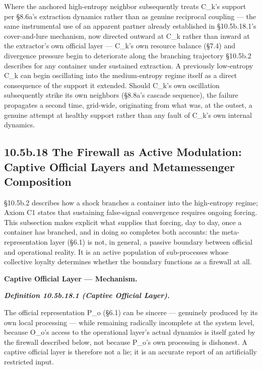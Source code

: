 \documentclass[
]{article}
\begin{document}
Where the anchored high-entropy neighbor subsequently treats C\_k's
support per §8.6a's extraction dynamics rather than as genuine
reciprocal coupling --- the same instrumental use of an apparent partner
already established in §10.5b.18.1's cover-and-lure mechanism, now
directed outward at C\_k rather than inward at the extractor's own
official layer --- C\_k's own resource balance (§7.4) and divergence
pressure begin to deteriorate along the branching trajectory §10.5b.2
describes for any container under sustained extraction. A previously
low-entropy C\_k can begin oscillating into the medium-entropy regime
itself as a direct consequence of the support it extended. Should C\_k's
own oscillation subsequently strike its own neighbors (§8.8a's cascade
sequence), the failure propagates a second time, grid-wide, originating
from what was, at the outset, a genuine attempt at healthy support
rather than any fault of C\_k's own internal dynamics.

\hypertarget{b.18-the-firewall-as-active-modulation-captive-official-layers-and-metamessenger-composition}{%
\subsection{10.5b.18 The Firewall as Active Modulation: Captive Official
Layers and Metamessenger
Composition}\label{b.18-the-firewall-as-active-modulation-captive-official-layers-and-metamessenger-composition}}

§10.5b.2 describes how a shock branches a container into the
high-entropy regime; Axiom C1 states that sustaining false-signal
convergence requires ongoing forcing. This subsection makes explicit
what supplies that forcing, day to day, once a container has branched,
and in doing so completes both accounts: the meta-representation layer
(§6.1) is not, in general, a passive boundary between official and
operational reality. It is an active population of sub-processes whose
collective loyalty determines whether the boundary functions as a
firewall at all.

\textbf{Captive Official Layer --- Mechanism.}

\emph{\textbf{Definition 10.5b.18.1 (Captive Official Layer).}}

The official representation P\_o (§6.1) can be sincere --- genuinely
produced by its own local processing --- while remaining radically
incomplete at the system level, because O\_o's access to the operational
layer's actual dynamics is itself gated by the firewall described below,
not because P\_o's own processing is dishonest. A captive official layer
is therefore not a lie; it is an accurate report of an artificially
restricted input.
\end{document}
